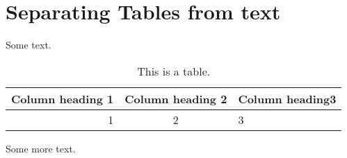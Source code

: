 \documentclass{article}
\begin{document}
\section{Separating Tables from text}
Some text.
\begin{table}[h]
  \centering %
  \begin{tabular}{ |r| c l }
    \hline
    Column heading 1 & Column heading 2 & Column heading3 \\ %
    \hline
    \hline
    1 & 2 & 3
  \end{tabular}
  \caption{This is a table.}
\end{table}
Some more text.
\end{document}
